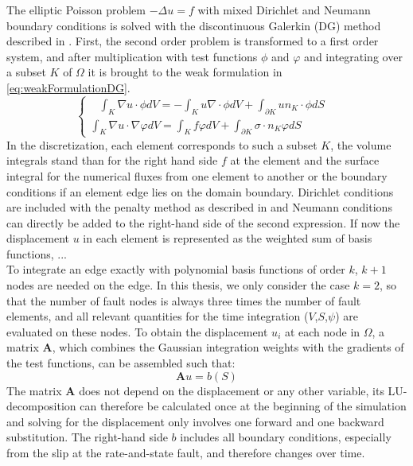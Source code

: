 The elliptic Poisson problem $-\Delta u = f$ with mixed Dirichlet and Neumann boundary conditions is solved with the discontinuous Galerkin (DG) method described in \cite{DG-quick-tutorial}. First, the second order problem is transformed to a first order system, and after multiplication with test functions $\phi$ and $\varphi$ and integrating over a subset $K$ of $\Omega$ it is brought to the weak formulation in \autoref{eq:weakFormulationDG}.
\begin{equation}
	\label{eq:weakFormulationDG}
	\begin{cases}
		\;\;\ \int_K\nabla u\cdot\phi dV = -\int_Ku\nabla\cdot\phi dV + \int_{\partial K} u n_K\cdot\phi dS &\\
		\int_K\nabla u\cdot\nabla\varphi dV = \int_Kf\varphi dV + \int_{\partial K} \sigma\cdot n_K\varphi dS &
	\end{cases}
\end{equation} 
In the discretization, each element corresponds to such a subset $K$, the volume integrals stand than for the right hand side $f$ at the element and the surface integral for the numerical fluxes from one element to another or the boundary conditions if an element edge lies on the domain boundary. Dirichlet conditions are included with the penalty method as described in \cite{DG-elliptic-problems} and Neumann conditions can directly be added to the right-hand side of the second expression. If now the displacement $u$ in each element is represented as the weighted sum of basis functions, ... \\
To integrate an edge exactly with polynomial basis functions of order $k$, $k+1$ nodes are needed on the edge. In this thesis, we only consider the case $k=2$, so that the number of fault nodes is always three times the number of fault elements, and all relevant quantities for the time integration ($V$,$S$,$\psi$) are evaluated on these nodes. To obtain the displacement $u_i$ at each node in $\Omega$, a matrix $\mathbf{A}$, which combines the Gaussian integration weights with the gradients of the test functions, can be assembled such that:
\begin{equation}
	\mathbf{A}u = b(S)
\end{equation}
The matrix $\mathbf{A}$ does not depend on the displacement or any other variable, its LU-decomposition can therefore be calculated once at the beginning of the simulation and solving for the displacement only involves one forward and one backward substitution. The right-hand side $b$ includes all boundary conditions, especially from the slip at the rate-and-state fault, and therefore changes over time. 


